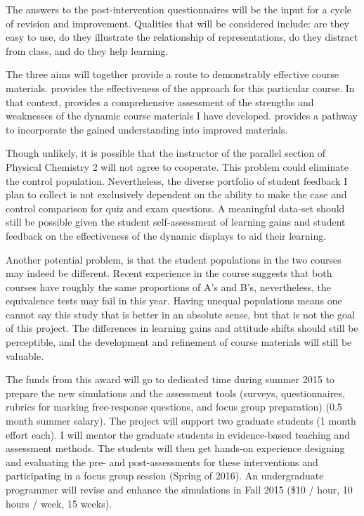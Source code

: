 \documentclass[10pt,letterpaper]{article}
\begin{document}
The answers to the post-intervention questionnaires  will be the input for a cycle of revision and improvement. Qualities that will be considered include: are they easy to use, do they illustrate the relationship of representations, do they distract from class, and do they help learning. 


The three aims will together provide a route to demonstrably effective course materials.  provides the effectiveness of the \pogil approach for this particular course. In that context,  provides a comprehensive assessment of the strengths and weaknesses of the dynamic course materials I have developed.  provides a pathway to incorporate the gained understanding into improved materials.


Though unlikely, it is possible that the instructor of the parallel section of Physical Chemistry 2 will not agree to cooperate. This problem could eliminate the control population. Nevertheless, the diverse portfolio of student feedback I plan to collect is not exclusively dependent on the ability to make the case and control comparison for quiz and exam questions. A meaningful data-set should still be possible given the student self-assessment of learning gains and student feedback on the effectiveness of the dynamic displays to aid their learning.

Another potential problem, is that the student populations in the two courses may indeed be different. Recent experience in the course suggests that both courses have roughly the same proportions of A's and B's, nevertheless, the equivalence tests may fail in this year. Having unequal populations means one cannot say this study  that \pogil is better in an absolute sense, but that is not the goal of this project. The differences in learning gains and attitude shifts should still be perceptible, and the development and refinement of course materials will still be valuable.


The funds from this award will go to dedicated time during summer 2015 to prepare the new simulations and the assessment tools (surveys, questionnaires, rubrics for marking free-response questions, and focus group preparation) (0.5 month summer salary). The project will support two graduate students (1 month effort each). I will mentor the graduate students in evidence-based teaching and assessment methods. The students will then get hands-on experience designing and evaluating the pre- and post-assessments for these interventions and participating in a focus group session (Spring of 2016). An undergraduate programmer will revise and enhance the simulations in Fall 2015 (\$10 / hour, 10 hours / week, 15 weeks).
\end{document}
